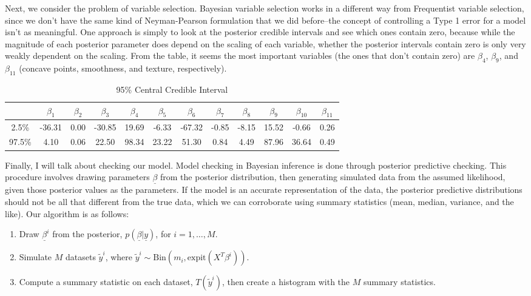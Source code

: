\documentclass[12pt]{article}
\begin{document}
Next, we consider the problem of variable selection. Bayesian variable selection works in a different way from Frequentist variable selection, since we don't have the same kind of Neyman-Pearson formulation that we did before--the concept of controlling a Type 1 error for a model isn't as meaningful. One approach is simply to look at the posterior credible intervals and see which ones contain zero, because while the magnitude of each posterior parameter does depend on the scaling of each variable, whether the posterior intervals contain zero is only very weakly dependent on the scaling. From the table, it seems the most important variables (the ones that don't contain zero)  are $\beta_4$, $\beta_9$, and $\beta_{11}$ (concave points, smoothness, and texture, respectively).  
\begin{table}[H] \center
\begin{tabular}{|c|ccccccccccc|} \hline
 & $\beta_1$ & $\beta_2$ & $\beta_3$ & $\beta_4$ & $\beta_5$ & $\beta_6$ & $\beta_7$ & $\beta_8$ & $\beta_9$ & $\beta_{10}$ & $\beta_{11}$ \\  \hline
2.5\% & -36.31 & 0.00 & -30.85 & 19.69 & -6.33 & -67.32 & -0.85 & -8.15 & 15.52 & -0.66 & 0.26 \\ 
  97.5\% & 4.10 & 0.06 & 22.50 & 98.34 & 23.22 & 51.30 & 0.84 & 4.49 & 87.96 & 36.64 & 0.49 \\ \hline
\end{tabular}
\caption*{95\% Central Credible Interval} 
\end{table}
 
Finally, I will talk about checking our model. Model checking in Bayesian inference is done through posterior predictive checking. This procedure involves drawing parameters $\underline{\beta}$ from the posterior distribution, then generating simulated data from the assumed likelihood, given those posterior values as the parameters. If the model is an accurate representation of the data, the posterior predictive distributions should not be all that different from the true data, which we can corroborate using summary statistics (mean, median, variance, and the like). Our algorithm is as follows:
\begin{enumerate}
\item Draw $\underline{\beta}^i$ from the posterior, $p(\underline{\beta} | \underline{y})$, for $i=1, \dots, M$. 
\item Simulate $M$ datasets $\tilde{y}^i$, where $\tilde{y}^i \sim \text{Bin}(m_i, \text{expit}(X^T \beta^i))$.
\item Compute a summary statistic on each dataset, $T(\tilde{y}^i)$, then create a histogram with the $M$ summary statistics.
\end{enumerate}
\end{document}
